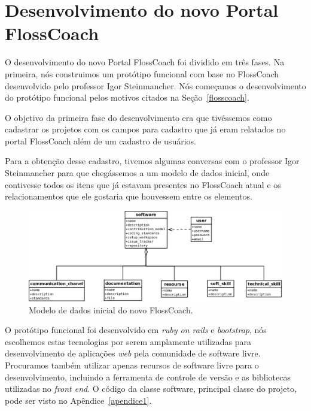 \chapter{Desenvolvimento do novo Portal \\FlossCoach}
\label{desenvolvimento}

O desenvolvimento do novo Portal FlossCoach foi dividido em três fases. Na primeira, 
nós construimos um protótipo funcional com base no FlossCoach desenvolvido pelo professor 
Igor Steinmancher. Nós começamos o
desenvolvimento do protótipo funcional pelos motivos citados na Seção~\ref{flosscoach}.

O objetivo da primeira fase do desenvolvimento era que tivéssemos como cadastrar 
os projetos com os campos para cadastro que já eram relatados no portal FlossCoach 
além de um cadastro de usuários.

Para a obtenção desse cadastro, tivemos algumas conversas com o professor Igor Steinmancher
para que chegássemos a um modelo de dados inicial, onde contivesse todos os itens que 
já estavam presentes no FlossCoach atual e os relacionamentos que ele gostaria que 
houvessem entre os elementos.

\begin{figure}[h]
	\centering
	\label{fig:diagrama_iicial}
		\includegraphics[keepaspectratio=true,scale=0.35]{figuras/diagrama_inicial.eps}
	\caption{Modelo de dados inicial do novo FlossCoach.}
\end{figure}

O protótipo funcional foi desenvolvido em \textit{ruby on rails} e \textit{bootstrap},
nós escolhemos estas tecnologias por serem amplamente utilizadas para desenvolvimento
de aplicações \textit{web} pela comunidade de software livre. Procuramos também utilizar
apenas recursos de software livre para o desenvolvimento, incluindo a ferramenta de 
controle de versão e as bibliotecas utilizadas no \textit{front end}. O código da classe
software, principal classe do projeto, pode ser visto no Apêndice~\ref{apendice1}.

